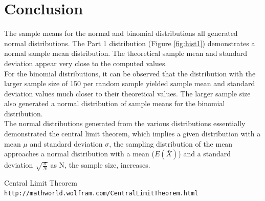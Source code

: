 \documentclass{article}
\begin{document}
    \clearpage

    \section{Conclusion}
    The sample means for the normal and binomial distributions all generated normal distributions. The Part 1 distribution (Figure \ref{fig:hist1}) demonstrates a normal sample mean distribution. The theoretical sample mean and standard deviation appear very close to the computed values.\\


    For the binomial distributions, it can be observed that the distribution with the larger sample size of 150 per random sample yielded sample mean and standard deviation values much closer to their theoretical values. The larger sample size also generated a normal distribution of sample means for the binomial distribution.\\



    The normal distributions generated from the various distributions essentially demonstrated the central limit theorem, which implies a given distribution with a mean $\mu$ and standard deviation $\sigma$, the sampling distribution of the mean approaches a normal distribution with a mean ($E(\overline{X})$) and a standard deviation $\sqrt{\frac{\sigma}{N}}$ as N, the sample size, increases. \cite{wolfram}

    \begin{thebibliography}{9}

        Central Limit Theorem
        \\\texttt{http://mathworld.wolfram.com/CentralLimitTheorem.html}

    \end{thebibliography}

    \clearpage
    \newpage
\end{document}
